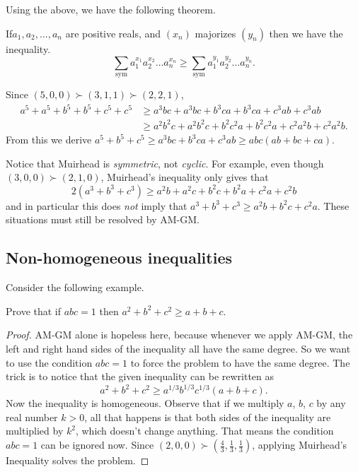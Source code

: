 \documentclass[11pt]{scrartcl}
\begin{document}
Using the above, we have the following theorem.
\begin{theorem}
   If$a_1, a_2, \dots, a_n$ are positive reals,
  and $(x_n)$ majorizes $(y_n)$ then we have the inequality.
  \[ \sum_{\text{sym}} a_1^{x_1} a_2^{x_2} \dots a_n^{x_n}
    \ge \sum_{\text{sym}} a_1^{y_1} a_2^{y_2} \dots a_n^{y_n}. \]
\end{theorem}
\begin{example}
  Since $(5,0,0) \succ (3,1,1) \succ (2,2,1)$,
  \begin{align*}
    a^5+a^5+b^5+b^5+c^5+c^5 &\ge a^3bc+a^3bc+b^3ca+b^3ca+c^3ab+c^3ab \\
    &\ge a^2b^2c+a^2b^2c + b^2c^2a+b^2c^2a + c^2a^2b + c^2a^2b.
  \end{align*}
  From this we derive $a^5+b^5+c^5 \ge a^3bc+b^3ca+c^3ab \ge abc(ab+bc+ca)$.
\end{example}
Notice that Muirhead is \emph{symmetric}, not \emph{cyclic}.
For example, even though $(3,0,0) \succ (2,1,0)$, Muirhead's inequality only gives that
\[ 2(a^3+b^3+c^3) \ge a^2b+a^2c+b^2c+b^2a+c^2a+c^2b \]
and in particular this does \emph{not} imply that $a^3+b^3+c^3 \ge a^2b+b^2c+c^2a$.
These situations must still be resolved by AM-GM.

\subsection{Non-homogeneous inequalities}
Consider the following example.
\begin{example}
  Prove that if $abc=1$ then $a^2+b^2+c^2 \ge a+b+c$.
\end{example}
\begin{proof}
  AM-GM alone is hopeless here,
  because whenever we apply AM-GM, the left and right hand sides of the inequality all have the same degree.
  So we want to use the condition $abc=1$ to force the problem to have the same degree.
  The trick is to notice that the given inequality can be rewritten as
  \[ a^2+b^2+c^2 \ge a^{1/3}b^{1/3}c^{1/3} \left( a+b+c \right). \]
  Now the inequality is homogeneous.
  Observe that if we multiply $a$, $b$, $c$ by any real number $k > 0$,
  all that happens is that both sides of the inequality are multiplied by $k^2$,
  which doesn't change anything.
  That means the condition $abc = 1$ can be ignored now.
  Since $(2,0,0) \succ (\frac 43, \frac 13, \frac 13)$,
  applying Muirhead's Inequality solves the problem.
\end{proof}
\end{document}
